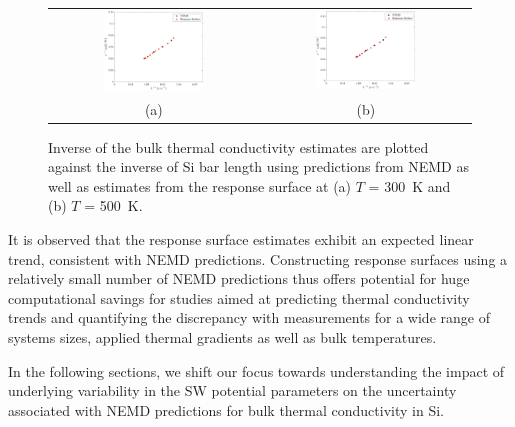 \begin{figure}[htbp]
\begin{center}
\begin{tabular}{cc}
 \hspace{-10mm}
  \includegraphics[width=0.50\textwidth]{./Figures/kinv_300}
  &
  \includegraphics[width=0.50\textwidth]{./Figures/kinv_500}
  \\ (a) & (b)
  \end{tabular}
 \caption{Inverse of the bulk thermal conductivity estimates are plotted against the inverse of Si bar length
 using predictions from NEMD as well as estimates from the response surface at (a)  $T$ = 300~K and 
 (b) $T$ = 500~K.}
\label{fig:kinv}
\end{center}
\end{figure}

It is observed that the response surface estimates exhibit an expected linear trend, consistent with NEMD
  predictions. Constructing response surfaces using a relatively small number of NEMD predictions thus offers
  potential for huge computational savings for studies aimed at predicting thermal conductivity trends and 
  quantifying the discrepancy with measurements for a wide range of systems sizes, applied thermal gradients as 
  well as bulk temperatures.

In the following sections, we shift our focus towards understanding the impact of underlying variability
in the SW potential parameters on the uncertainty associated with NEMD predictions for bulk
thermal conductivity in Si.  
 




































